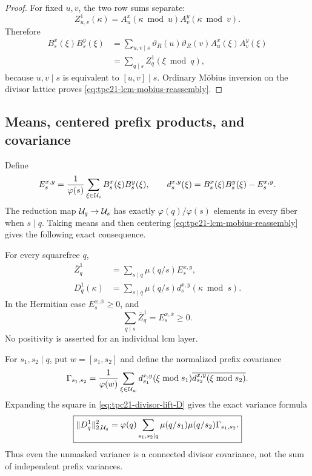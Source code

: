\begin{proof}
For fixed \(u,v\), the two row sums separate:
\[
 Z_{u,v}^{1}(\kappa)
 =A_u^x(\kappa\bmod u)A_v^y(\kappa\bmod v).
\]
Therefore
\begin{align*}
 B_s^x(\xi)B_s^y(\xi)
 &=\sum_{u,v\mid s}\vartheta_R(u)\vartheta_R(v)
 A_u^x(\xi)A_v^y(\xi)\\
 &=\sum_{q\mid s}Z_q^{1}(\xi\bmod q),
\end{align*}
because \(u,v\mid s\) is equivalent to \([u,v]\mid s\).  Ordinary
M\"obius inversion on the divisor lattice proves
\eqref{eq:tpc21-lcm-mobius-reassembly}.
\end{proof}

\subsection{Means, centered prefix products, and covariance}

Define
\begin{equation}
 E_s^{x,y}
 =\frac1{\varphi(s)}\sum_{\xi\in\mathcal U_s}
 B_s^x(\xi)B_s^y(\xi),
 \qquad
 d_s^{x,y}(\xi)
 =B_s^x(\xi)B_s^y(\xi)-E_s^{x,y}.
 \label{eq:tpc21-prefix-mean-discrepancy}
\end{equation}
The reduction map \(\mathcal U_q\to\mathcal U_s\) has exactly
\(\varphi(q)/\varphi(s)\) elements in every fiber when \(s\mid q\).
Taking means and then centering
\eqref{eq:tpc21-lcm-mobius-reassembly} gives the following exact
consequence.

\begin{corollary}
\label{cor:tpc21-divisor-lift-discrepancy}
For every squarefree \(q\),
\begin{align}
 \overline Z_q^{1}
 &=\sum_{s\mid q}\mu(q/s)E_s^{x,y},
 \label{eq:tpc21-divisor-lift-mean}\\
 D_q^{1}(\kappa)
 &=\sum_{s\mid q}\mu(q/s)
 d_s^{x,y}(\kappa\bmod s).
 \label{eq:tpc21-divisor-lift-D}
\end{align}
In the Hermitian case \(E_s^{x,\overline x}\ge0\), and
\begin{equation}
 \sum_{q\mid s}\overline Z_q^{1}=E_s^{x,\overline x}\ge0.
 \label{eq:tpc21-cumulative-mean-positive}
\end{equation}
No positivity is asserted for an individual lcm layer.
\end{corollary}

For \(s_1,s_2\mid q\), put \(w=[s_1,s_2]\) and define the normalized
prefix covariance
\begin{equation}
 \Gamma_{s_1,s_2}
 =\frac1{\varphi(w)}\sum_{\xi\in\mathcal U_w}
 d_{s_1}^{x,y}(\xi\bmod s_1)
 \overline{d_{s_2}^{x,y}(\xi\bmod s_2)}.
 \label{eq:tpc21-prefix-covariance}
\end{equation}
Expanding the square in \eqref{eq:tpc21-divisor-lift-D} gives the exact
variance formula
\begin{equation}
 \boxed{
 \lVert D_q^{1}\rVert_{2,\mathcal U_q}^{2}
 =\varphi(q)\sum_{s_1,s_2\mid q}
 \mu(q/s_1)\mu(q/s_2)\Gamma_{s_1,s_2}.}
 \label{eq:tpc21-exact-divisor-covariance}
\end{equation}
Thus even the unmasked variance is a connected divisor covariance, not
the sum of independent prefix variances.

